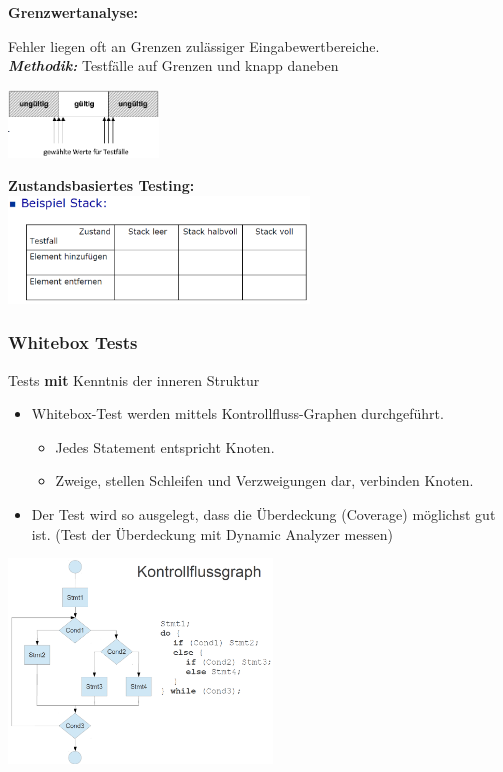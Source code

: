\textbf{Grenzwertanalyse:} \\
\begin{minipage}{12cm}
Fehler liegen oft an Grenzen zulässiger Eingabewertbereiche. \\
\textit{\textbf{Methodik:}} Testfälle auf Grenzen und knapp daneben \\
\vspace{2cm}
\end{minipage}
\begin{minipage}{4cm}
	\includegraphics[width=4cm]{images/grenzwertanalyse.png}
\end{minipage}

\textbf{Zustandsbasiertes Testing:} \\
\includegraphics[width = 8cm]{images/stack}
\clearpage
\subsubsection{Whitebox Tests}
\begin{minipage}{8cm}
Tests \textbf{mit} Kenntnis der inneren Struktur\\

\begin{itemize}
\item Whitebox-Test werden mittels Kontrollfluss-Graphen durchgeführt.
\begin{itemize}
	\item Jedes Statement entspricht Knoten.
	\item Zweige, stellen Schleifen und Verzweigungen dar, verbinden Knoten.
\end{itemize}
\item Der Test wird so ausgelegt, dass die Überdeckung (Coverage) möglichst gut ist. (Test der Überdeckung mit Dynamic Analyzer messen)
\end{itemize}
\end{minipage}
\begin{minipage}{7cm}
	\includegraphics[width=7cm]{images/kontrollflussgraphen.png}
\end{minipage}

